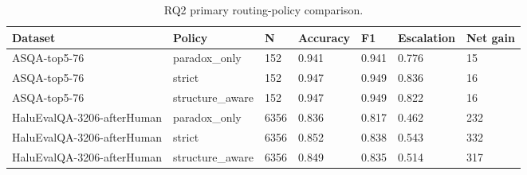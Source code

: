 \begin{table}[htbp]
\centering
\caption{RQ2 primary routing-policy comparison.}
\label{tab:rq2-primary-policies}
\begin{tabular}{lllllll}
\toprule
Dataset & Policy & N & Accuracy & F1 & Escalation & Net gain \\
\midrule
ASQA-top5-76 & paradox\_only & 152 & 0.941 & 0.941 & 0.776 & 15 \\
ASQA-top5-76 & strict & 152 & 0.947 & 0.949 & 0.836 & 16 \\
ASQA-top5-76 & structure\_aware & 152 & 0.947 & 0.949 & 0.822 & 16 \\
HaluEvalQA-3206-afterHuman & paradox\_only & 6356 & 0.836 & 0.817 & 0.462 & 232 \\
HaluEvalQA-3206-afterHuman & strict & 6356 & 0.852 & 0.838 & 0.543 & 332 \\
HaluEvalQA-3206-afterHuman & structure\_aware & 6356 & 0.849 & 0.835 & 0.514 & 317 \\
\bottomrule
\end{tabular}
\end{table}
